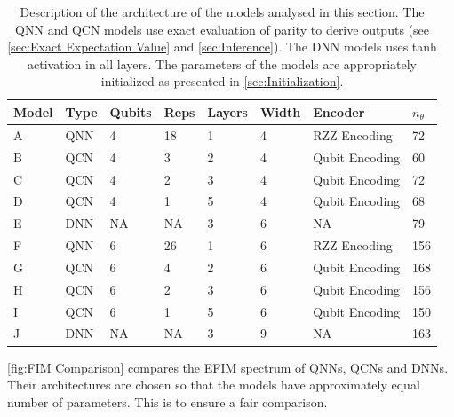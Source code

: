 \begin{table}[H]
\centering
\begin{tabular}{|l|l|l|l|l|l|l|l|}
\hline
Model &Type & Qubits& Reps & Layers & Width & Encoder        & $n_{\theta}$ \\ \hline
A    & QNN & 4& 18   & 1      & 4     & RZZ Encoding   & 72  \\ \hline
B    & QCN & 4& 3    & 2      & 4     & Qubit Encoding & 60 \\ \hline
C    & QCN & 4& 2    & 3      & 4     & Qubit Encoding & 72  \\ \hline
D    & QCN & 4& 1    & 5      & 4     & Qubit Encoding & 68  \\ \hline
E    & DNN & NA& NA   & 3      & 6     & NA             & 79 \\ \hline
F    & QNN & 6& 26   & 1      & 6     & RZZ Encoding   & 156  \\ \hline
G    & QCN & 6& 4    & 2      & 6     & Qubit Encoding & 168 \\ \hline
H    & QCN & 6& 2    & 3      & 6     & Qubit Encoding & 156  \\ \hline
I    & QCN & 6& 1    & 5      & 6     & Qubit Encoding & 150  \\ \hline
J    & DNN & NA& NA   & 3      & 9     & NA             & 163 \\ \hline
\end{tabular}
\caption{Description of the architecture of the models analysed in this section. The QNN and QCN models use exact evaluation of parity to derive outputs (see \autoref{sec:Exact Expectation Value} and \autoref{sec:Inference}). The DNN models uses tanh activation in all layers. The parameters of the models are appropriately initialized as presented in \autoref{sec:Initialization}.} 
\label{tab:FIM models}
\end{table}

\autoref{fig:FIM Comparison} compares the EFIM spectrum of QNNs, QCNs and DNNs. Their architectures are chosen so that the models have approximately equal number of parameters. This is to ensure a fair comparison. 

